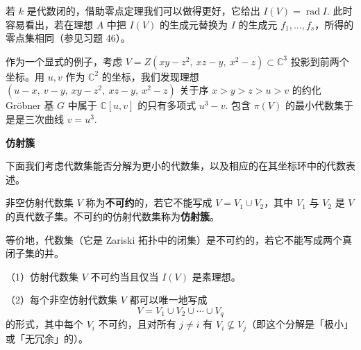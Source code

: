 若 \(k\) 是代数闭的，借助零点定理我们可以做得更好，它给出 \(I(V) = \operatorname{rad}I\). 此时容易看出，若在理想 \(A\) 中把 \(I(V)\) 的生成元替换为 \(I\) 的生成元 \(f_1, \ldots, f_s\)，所得的零点集相同（参见习题 46）。

作为一个显式的例子，考虑 \(V = Z(xy-z^2,\ xz-y,\ x^2-z) \subset \mathbb{C}^3\) 投影到前两个坐标。用 \(u, v\) 作为 \(\mathbb{C}^2\) 的坐标，我们发现理想 \((u-x,\ v-y,\ xy-z^2,\ xz-y,\ x^2-z)\) 关于序 \(x > y > z > u > v\) 的约化 Gröbner 基 \(G\) 中属于 \(\mathbb{C}[u,v]\) 的只有多项式 \(u^3-v\). 包含 \(\pi(V)\) 的最小代数集于是是三次曲线 \(v = u^3\).

\noindent\textbf{仿射簇}

下面我们考虑代数集能否分解为更小的代数集，以及相应的在其坐标环中的代数表述。

\begin{definition}
非空仿射代数集 \(V\) 称为\textbf{不可约}的，若它不能写成 \(V = V_1 \cup V_2\)，其中 \(V_1\) 与 \(V_2\) 是 \(V\) 的真代数子集。不可约的仿射代数集称为\textbf{仿射簇}。
\end{definition}

等价地，代数集（它是 Zariski 拓扑中的闭集）是不可约的，若它不能写成两个真闭子集的并。

\begin{proposition}\label{pro:15.17}
（1）仿射代数集 \(V\) 不可约当且仅当 \(I(V)\) 是素理想。

（2）每个非空仿射代数集 \(V\) 都可以唯一地写成
\[
V = V_1 \cup V_2 \cup \cdots \cup V_q
\]
的形式，其中每个 \(V_i\) 不可约，且对所有 \(j \neq i\) 有 \(V_i \nsubseteq V_j\)（即这个分解是「极小」或「无冗余」的）。
\end{proposition}


